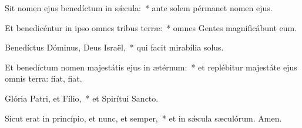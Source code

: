 \item Sit nomen ejus benedíctum in sǽcula:~* ante solem pérmanet nomen ejus.

\item Et benedicéntur in ipso omnes tribus terræ:~* omnes Gentes magnificábunt eum.

\item Benedíctus Dóminus, Deus Israël,~* qui facit mirabília solus.

\item Et benedíctum nomen majestátis ejus in ætérnum:~* et replébitur majestáte ejus omnis terra: fiat, fiat.

\item Glória Patri, et Fílio,~* et Spirítui Sancto.

\item Sicut erat in princípio, et nunc, et semper,~* et in sǽcula sæculórum. Amen.

